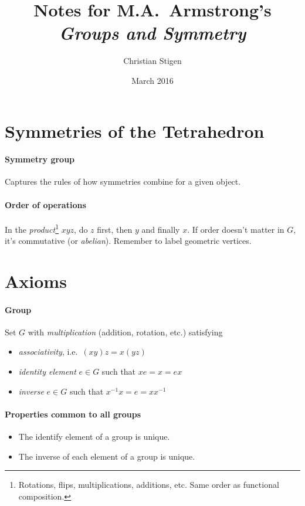 \documentclass[a4paper,twocolumn,10pt]{article}
\title{Notes for M.A.~Armstrong's \textit{Groups and Symmetry}}
\author{Christian Stigen}
\date{March 2016}
\begin{document}
  \maketitle
  \section{Symmetries of the Tetrahedron}
  \paragraph{Symmetry group} Captures the rules of how symmetries combine for a
  given object.

  \paragraph{Order of operations} In the \textit{product}\footnote{Rotations,
  flips, multiplications, additions, etc. Same order as functional
  composition.} $xyz$, do $z$ first, then $y$ and finally $x$. If order doesn't
  matter in $G$, it's commutative (or \textit{abelian}). Remember to label
  geometric vertices.

  \section{Axioms}
  \paragraph{Group}  Set $G$ with \textit{multiplication} (addition,
  rotation, etc.) satisfying
  \begin{itemize}
    \item \textit{associativity}, i.e.~$(xy)z = x(yz)$
    \item \textit{identity element} $e \in G$ such that $xe=x=ex$
    \item \textit{inverse} $e \in G$ such that $x^{-1}x=e=xx^{-1}$
  \end{itemize}

  \paragraph{Properties common to all groups}
  \begin{itemize}
    \item The identify element of a group is unique.
    \item The inverse of each element of a group is unique.
  \end{itemize}
\end{document}
